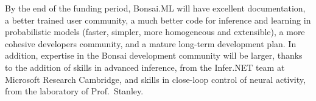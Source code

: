 By the end of the funding period, Bonsai.ML will have excellent documentation,
a better trained user community, a much better code for inference and learning
in probabilistic models (faster, simpler, more homogeneous and extensible), a
more cohesive developers community, and a mature long-term development plan.
%
In addition, expertise in the Bonsai development community will be larger,
thanks to the addition of skills in advanced inference, from the Infer.NET team
at Microsoft Research Cambridge, and skills in close-loop control of neural
activity, from the laboratory of Prof.~Stanley.
